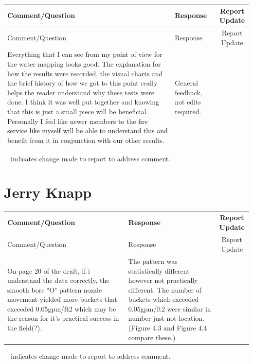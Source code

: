 \documentclass[12pt,oneside]{book}
\begin{document}
\begin{landscape}
\begin{longtable}{|L{4in}|L{3.75in}|c|}
		\hline
		Comment/Question & Response & Report Update \\ 
		\toprule[1.0pt] \endfirsthead
		\hline
		Comment/Question & Response & Report Update \\ 
		\toprule[1.0pt] \endhead
		\hline
		Everything that I can see from my point of view for the water mapping looks good. The explanation for how the results were recorded, the visual charts and the brief history of how we got to this point really helps the reader understand why these tests were done. I think it was well put together and knowing that this is just a small piece will be beneficial. Personally I feel like newer members to the fire service like myself will be able to understand this and benefit from it in conjunction with our other results. & 
		General feedback, not edits required. & \\
 
 		\hline
\end{longtable}
\checkmark~~indicates change made to report to address comment.

\newpage

\section{Jerry Knapp}
\begin{longtable}{|L{4in}|L{3.75in}|c|}

		\hline
		Comment/Question & Response & Report Update \\ 
		\toprule[1.0pt] \endfirsthead
		\hline
		Comment/Question & Response & Report Update \\ 
		\toprule[1.0pt] \endhead
		\hline
		On page 20 of the draft, if i understand the data correctly, the smooth bore "O" pattern nozzle movement yielded more buckets that exceeded 0.05gpm/ft2 which may be the reason for it's practical success in the field(?). & 
		The pattern was statistically different however not practically different. The number of buckets which exceeded 0.05gpm/ft2 were similar in number just not location. (Figure 4.3 and Figure 4.4 compare these.) & \\
 
 		\hline
\end{longtable}
\checkmark~~indicates change made to report to address comment.

\newpage


\end{landscape}
\end{document}
